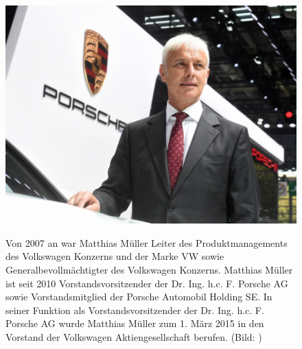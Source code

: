 \documentclass[12pt]{article}
\begin{document}
\begin{figure}[here!]
	\centering
	\begin{minipage}[h]{0.20\textwidth}
		\centering
		\includegraphics[width=1.0\textwidth]{images/MathiasMueller.jpg}
		\label{fig:vorstandvw4}
	\end{minipage}
	\begin{minipage}[h]{0.10\textwidth}
		\hspace{1cm} 
	\end{minipage}
	\begin{minipage}[h]{0.65\textwidth}
		Von 2007 an war Matthias Müller Leiter des Produktmanagements des Volkswagen Konzerns und der Marke VW sowie Generalbevollmächtigter des Volkswagen Konzerns. Matthias Müller ist seit 2010 Vorstandsvorsitzender der Dr. Ing. h.c. F. Porsche AG sowie Vorstandsmitglied der Porsche Automobil Holding SE.
		In seiner Funktion als Vorstandsvorsitzender der Dr. Ing. h.c. F. Porsche AG wurde Matthias Müller zum 1. März 2015 in den Vorstand der Volkswagen Aktiengesellschaft berufen. (Bild: \cite{mmpic} )
	\end{minipage}
\end{figure}
\end{document}
